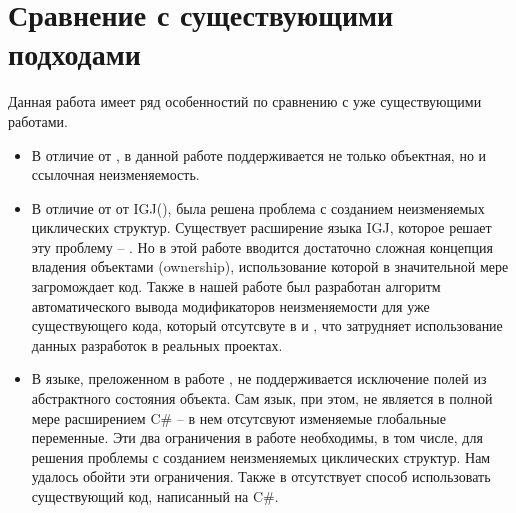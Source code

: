 \section{Сравнение с существующими подходами}

Данная работа имеет ряд особенностий по сравнению с уже существующими работами. 

\begin{itemize}
	\item В отличие от \cite{Tschantz2006}, в данной работе поддерживается не только объектная, но и ссылочная неизменяемость.
	\item В отличие от от IGJ(\cite{Zibin2007}), была решена проблема с созданием неизменяемых циклических структур. Существует расширение языка IGJ, которое решает эту проблему -- \cite{Potanin}. Но в этой работе вводится достаточно сложная концепция владения объектами (ownership), использование которой в значительной мере загромождает код. Также в нашей работе был разработан алгоритм автоматического вывода модификаторов неизменяемости для уже существующего кода, который отсутсвуте в \cite{Zibin2007} и \cite{Potanin}, что затрудняет использование данных разработок в реальных проектах. 
	\item В языке, преложенном в работе \cite{Gordon2012}, не поддерживается исключение полей из абстрактного состояния объекта. Сам язык, при этом, не является в полной мере расширением C\# -- в нем отсутсвуют изменяемые глобальные переменные. Эти два ограничения в работе \cite{Gordon2012} необходимы, в том числе, для решения проблемы с созданием неизменяемых циклических структур. Нам удалось обойти эти ограничения. Также в \cite{Gordon2012} отсутствует способ использовать существующий код, написанный на C\#.
\end{itemize}

























